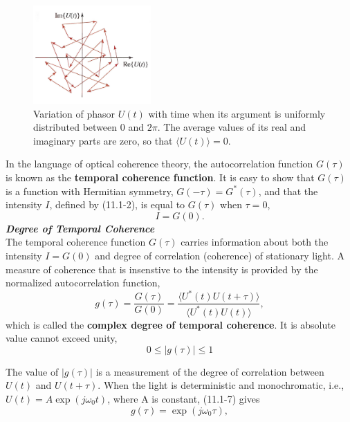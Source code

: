 \documentclass{article}
\numberwithin{figure}{subsection}
\numberwithin{table}{subsection}
\begin{document}
\begin{figure}[ht]
\centering
\includegraphics[width=0.4\textwidth]{11_1_2.PNG}
\caption{Variation of phasor $ U(t) $ with time when its argument is uniformly distributed between 0 and $ 2\pi $. The average values of its real and imaginary parts are zero, so that $ \langle U(t) \rangle = 0 $.}
\label{fig: 11_1_2}
\end{figure}
\par In the language of optical coherence theory, the autocorrelation function $ G(\tau) $ is known as the \textbf{temporal coherence function}. It is easy to show that $ G(\tau) $ is a function with Hermitian symmetry, $ G(-\tau) = G^\ast (\tau) $, and that the intensity $ I $, defined by (11.1-2), is equal to $ G(\tau) $ when $ \tau =0 $,
\begin{equation}
I = G(0).
\end{equation}
\bigbreak\noindent\textcolor{ksc}{\textbf{\textsl{Degree of Temporal Coherence}}}\\
The temporal coherence function $ G(\tau) $ carries information about both the intensity $ I = G(0) $ and degree of correlation (coherence) of stationary light. A measure of coherence that is insenstive to the intensity is provided by the normalized autocorrelation function,
\begin{equation}
g(\tau) = \frac{G(\tau)}{G(0)} = \frac{\langle U^\ast (t)U(t+\tau) \rangle}{\langle U^\ast (t)U(t) \rangle},
\end{equation}
which is called the \textbf{complex degree of temporal coherence}. It is absolute value cannot exceed unity,
\begin{equation}
0\leq \lvert g(\tau) \rvert \leq 1
\end{equation}
\par The value of $ \lvert g(\tau) \rvert $ is a measurement of the degree of correlation between $ U(t) $ and $ U(t+\tau) $. When the light is deterministic and monochromatic, i.e., $ U(t) =A \exp(j\omega_0 t) $, where A is constant, (11.1-7) gives
\begin{equation}
g(\tau) = \exp(j\omega_0 \tau),
\end{equation} 
\end{document}
